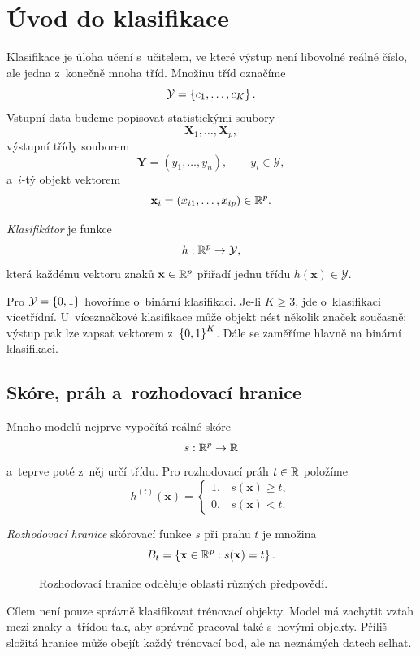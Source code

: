 \section{Úvod do klasifikace}\label{sec:ai-uvod-klasifikace}

Klasifikace je úloha učení s~učitelem, ve které výstup není libovolné reálné číslo, ale jedna z~konečně mnoha tříd. Množinu tříd označíme
\[
    \mathcal{Y}=\left\{c_1,\ldots,c_K\right\}.
\]
Vstupní data budeme popisovat statistickými soubory
\[
    \mathbf{X}_1,\ldots,\mathbf{X}_p,
\]
výstupní třídy souborem
\[
    \mathbf{Y}=(y_1,\ldots,y_n),
    \qquad y_i\in\mathcal{Y},
\]
a~\(i\)-tý objekt vektorem
\[
    \mathbf{x}_i=(x_{i1},\ldots,x_{ip})\in\mathbb{R}^p.
\]

\begin{definition}\label{def:ai-klasifikator}
    \emph{Klasifikátor} je funkce
    \[
        h:\mathbb{R}^p \rightarrow \mathcal{Y},
    \]
    která každému vektoru znaků \(\mathbf{x}\in\mathbb{R}^p\) přiřadí jednu třídu
    \(h(\mathbf{x})\in\mathcal{Y}\).
\end{definition}

Pro \(\mathcal{Y}=\left\{0,1\right\}\) hovoříme o~binární klasifikaci. Je-li
\(K\geqslant3\), jde o~klasifikaci vícetřídní. U~víceznačkové klasifikace může objekt nést několik značek současně; výstup pak lze zapsat vektorem z~\(\left\{0,1\right\}^K\). Dále se zaměříme hlavně na binární klasifikaci.

\subsection{Skóre, práh a~rozhodovací hranice}

Mnoho modelů nejprve vypočítá reálné skóre
\[
    s:\mathbb{R}^p \rightarrow \mathbb{R}
\]
a~teprve poté z~něj určí třídu. Pro rozhodovací práh \(t\in\mathbb{R}\) položíme
\[
    h^{(t)}(\mathbf{x})
    =
    \begin{cases}
        1, & s(\mathbf{x})\geqslant t,\\
        0, & s(\mathbf{x})<t.
    \end{cases}
\]

\begin{definition}\label{def:ai-rozhodovaci-hranice}
    \emph{Rozhodovací hranice} skórovací funkce \(s\) při prahu \(t\) je množina
    \[
        B_t
        =
        \left\{
            \mathbf{x}\in\mathbb{R}^p:
            s(\mathbf{x})=t
        \right\}.
    \]
\end{definition}

\begin{figure}[ht]
    \centering
    
    \caption{Rozhodovací hranice odděluje oblasti různých předpovědí.}
    \label{fig:ai-rozhodovaci-hranice}
\end{figure}

Cílem není pouze správně klasifikovat trénovací objekty. Model má zachytit vztah mezi znaky a~třídou tak, aby správně pracoval také s~novými objekty. Příliš složitá hranice může obejít každý trénovací bod, ale na neznámých datech selhat.
